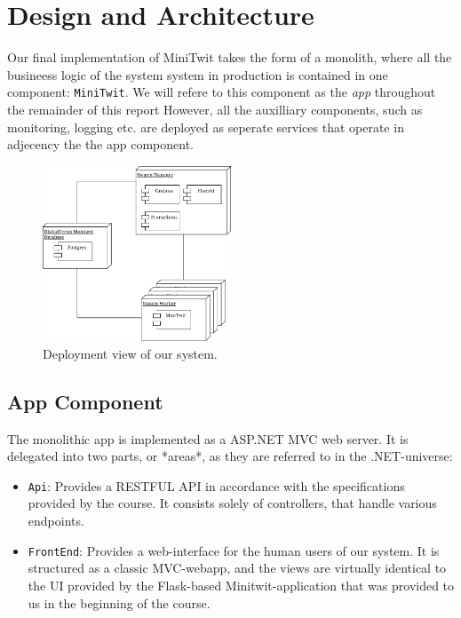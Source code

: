 \section{Design and Architecture}\label{sec:design-arch}

Our final implementation of MiniTwit takes the form of a monolith, where all the busineess logic of the system system in production is contained in one component: \texttt{MiniTwit}. We will refere to this component as the \textit{app} throughout the remainder of this report
However, all the auxilliary components, such as monitoring, logging etc. are deployed as seperate services that operate in adjecency the the app component.

\begin{figure}
  \begin{center}
    \includegraphics[width=0.50\textwidth]{img/deployment.pdf}
  \end{center}
  \caption{Deployment view of our system.}\label{fig:deployment}
\end{figure}


\subsection{App Component}

The monolithic app is implemented as a ASP.NET MVC web server. It is delegated into two parts, or *areas*, as they are referred to in the .NET-universe:

\begin{itemize}
    \item \texttt{Api}: Provides a RESTFUL API in accordance with the specifications provided by the course. It consists solely of controllers, that handle various endpoints.
    \item \texttt{FrontEnd}: Provides a web-interface for the human users of our system. It is structured as a classic MVC-webapp, and the views are virtually identical to the UI provided by the Flask-based Minitwit-application that was provided to us in the beginning of the course.
\end{itemize}

